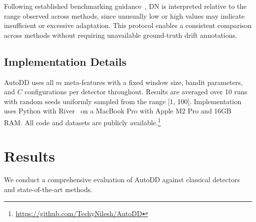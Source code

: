 \documentclass[conference]{IEEEtran}
\begin{document}
Following established benchmarking guidance~\cite{Souza2020Benchmark}, DN is interpreted relative to the range observed across methods, since unusually low or high values may indicate insufficient or excessive adaptation. This protocol enables a consistent comparison across methods without requiring unavailable ground-truth drift annotations.

\subsection{Implementation Details}
AutoDD uses all $m$ meta-features with a fixed window size, bandit parameters, and $C$ configurations per detector throughout. Results are averaged over 10 runs with random seeds uniformly sampled from the range [1, 100]. Implementation uses Python with River~\cite{Montiel2021River} on a MacBook Pro with Apple M2 Pro and 16GB RAM. All code and datasets are publicly available.\footnote{\url{https://github.com/TechyNilesh/AutoDD}}

\section{Results}
\label{sec:results}

We conduct a comprehensive evaluation of AutoDD against classical detectors and state-of-the-art methods.
\end{document}

